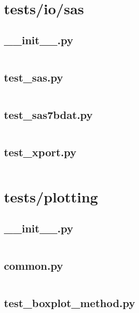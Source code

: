 \documentclass{article}
\begin{document}
\section{tests/io/sas}

\subsection{\_\_init\_\_.py}
\inputminted{python}{/home/dufferzafar/dev/@clones/pandas/pandas/tests/io/sas/__init__.py}
\newpage

\subsection{test\_sas.py}
\inputminted{python}{/home/dufferzafar/dev/@clones/pandas/pandas/tests/io/sas/test_sas.py}
\newpage

\subsection{test\_sas7bdat.py}
\inputminted{python}{/home/dufferzafar/dev/@clones/pandas/pandas/tests/io/sas/test_sas7bdat.py}
\newpage

\subsection{test\_xport.py}
\inputminted{python}{/home/dufferzafar/dev/@clones/pandas/pandas/tests/io/sas/test_xport.py}
\newpage

\section{tests/plotting}

\subsection{\_\_init\_\_.py}
\inputminted{python}{/home/dufferzafar/dev/@clones/pandas/pandas/tests/plotting/__init__.py}
\newpage

\subsection{common.py}
\inputminted{python}{/home/dufferzafar/dev/@clones/pandas/pandas/tests/plotting/common.py}
\newpage

\subsection{test\_boxplot\_method.py}
\inputminted{python}{/home/dufferzafar/dev/@clones/pandas/pandas/tests/plotting/test_boxplot_method.py}
\newpage
\end{document}
